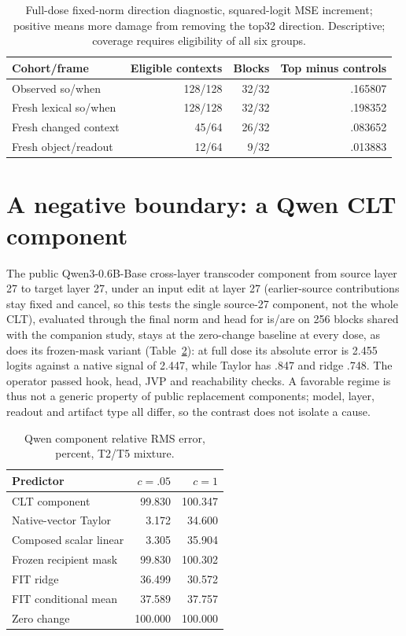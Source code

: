 \documentclass[11pt]{article}
\begin{document}
\begin{table}[ht]\centering\small
\begin{tabular}{lrrr}\toprule Cohort/frame & Eligible contexts & Blocks & Top minus controls\\\midrule
Observed so/when & 128/128 & 32/32 & .165807\\
Fresh lexical so/when & 128/128 & 32/32 & .198352\\
Fresh changed context & 45/64 & 26/32 & .083652\\
Fresh object/readout & 12/64 & 9/32 & .013883\\\bottomrule\end{tabular}
\caption{Full-dose fixed-norm direction diagnostic, squared-logit MSE increment; positive means more damage from removing the top32 direction. Descriptive; coverage requires eligibility of all six groups.}\label{tab:norm}
\end{table}

\section{A negative boundary: a Qwen CLT component}
The public Qwen3-0.6B-Base cross-layer transcoder component from source layer 27 to target layer 27, under an input edit at layer 27 (earlier-source contributions stay fixed and cancel, so this tests the single source-27 component, not the whole CLT), evaluated through the final norm and head for is/are on 256 blocks shared with the companion study, stays at the zero-change baseline at every dose, as does its frozen-mask variant (Table~\ref{tab:qwen}): at full dose its absolute error is 2.455 logits against a native signal of 2.447, while Taylor has .847 and ridge .748. The operator passed hook, head, JVP and reachability checks. A favorable regime is thus not a generic property of public replacement components; model, layer, readout and artifact type all differ, so the contrast does not isolate a cause.

\begin{table}[ht]\centering\small
\begin{tabular}{lrr}\toprule Predictor & $c=.05$ & $c=1$\\\midrule
CLT component & 99.830 & 100.347\\
Native-vector Taylor & 3.172 & 34.600\\
Composed scalar linear & 3.305 & 35.904\\
Frozen recipient mask & 99.830 & 100.302\\
FIT ridge & 36.499 & 30.572\\
FIT conditional mean & 37.589 & 37.757\\
Zero change & 100.000 & 100.000\\\bottomrule\end{tabular}
\caption{Qwen component relative RMS error, percent, T2/T5 mixture.}\label{tab:qwen}
\end{table}
\end{document}

